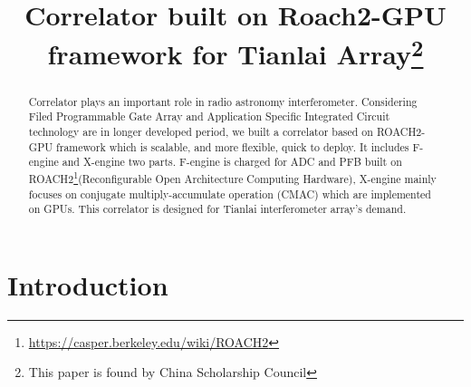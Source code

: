 \documentclass{ws-jai}
\begin{document}


\title{Correlator built on Roach2-GPU framework for Tianlai Array\footnote{This paper is found by  China Scholarship Council }}  

\author{
}

\address{
\small
$^1$Central China Normal University ,Luoyu Road, Wuhan, China\\
$^2$National Astronomy Observatory , Chinese Academy of Sciences \\Datun(A) Road, No.30,Beijing, China\\
$^3$University of California Berkeley, Campbell Hall 339, Berkeley CA 94720\\
$^4$China Three Gorges University,Yichang China 443002
}

\maketitle
{}


\begin{abstract}
Correlator plays an important role in radio astronomy interferometer. Considering Filed Programmable Gate Array and Application Specific Integrated Circuit technology are in longer developed period, we built a correlator based on ROACH2-GPU framework which is scalable, and  more flexible, quick to deploy. It includes F-engine and X-engine two parts. F-engine is charged for ADC and PFB built on ROACH2\footnote{ \url{https://casper.berkeley.edu/wiki/ROACH2}}(Reconfigurable Open Architecture Computing Hardware), X-engine mainly focuses on  conjugate multiply-accumulate operation (CMAC)   which are implemented on GPUs. This correlator is designed for Tianlai interferometer array's demand.

\end{abstract}
%

\section{Introduction}
\end{document}
